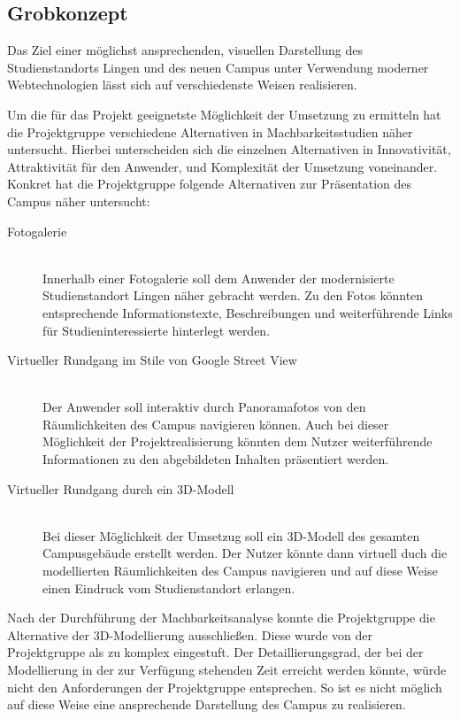 \subsection{Grobkonzept}
\label{sec:Grobkonzept}

Das Ziel einer möglichst ansprechenden, visuellen Darstellung des
Studienstandorts Lingen und des neuen Campus unter Verwendung moderner
Webtechnologien lässt sich auf verschiedenste Weisen realisieren. 

Um die für das Projekt geeignetste Möglichkeit der Umsetzung zu ermitteln hat
die Projektgruppe verschiedene Alternativen in Machbarkeitsstudien näher
untersucht. Hierbei unterscheiden sich die einzelnen Alternativen in
Innovativität, Attraktivität für den Anwender, und Komplexität der Umsetzung
voneinander. Konkret hat die Projektgruppe folgende Alternativen zur
Präsentation des Campus näher untersucht:

\begin{description}
\item[Fotogalerie] \hfill \\
Innerhalb einer Fotogalerie soll dem Anwender der modernisierte Studienstandort
Lingen näher gebracht werden. Zu den Fotos könnten entsprechende
Informationstexte, Beschreibungen und weiterführende Links für
Studieninteressierte hinterlegt werden.
\item[Virtueller Rundgang im Stile von Google Street View] \hfill \\
Der Anwender soll interaktiv durch Panoramafotos von den Räumlichkeiten des
Campus navigieren können. Auch bei dieser Möglichkeit der Projektrealisierung
könnten dem Nutzer weiterführende Informationen zu den abgebildeten Inhalten
präsentiert werden.
\item[Virtueller Rundgang durch ein 3D-Modell] \hfill \\
Bei dieser Möglichkeit der Umsetzug soll ein 3D-Modell des gesamten
Campusgebäude erstellt werden. Der Nutzer könnte dann virtuell duch die
modellierten Räumlichkeiten des Campus navigieren und auf diese Weise einen
Eindruck vom Studienstandort erlangen.
\end{description}

Nach der Durchführung der Machbarkeitsanalyse konnte die Projektgruppe die
Alternative der 3D-Modellierung ausschließen. Diese wurde von der Projektgruppe
als zu komplex eingestuft. Der Detaillierungsgrad, der bei der Modellierung in
der zur Verfügung stehenden Zeit erreicht werden könnte, würde nicht den
Anforderungen der Projektgruppe entsprechen. So ist es nicht möglich auf diese
Weise eine ansprechende Darstellung des Campus zu realisieren. 

